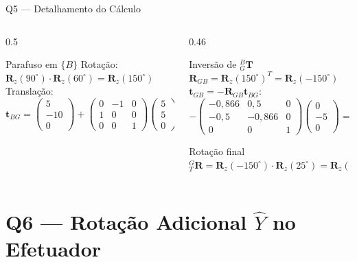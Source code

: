 \documentclass[aspectratio=169,12pt]{beamer}
\newcommand{\Rz}[1]{\mathbf{R}_z(#1)}
\newcommand{\Rot}[2]{{}^{#1}_{#2}\!\mathbf{R}}
\newcommand{\degr}{^{\circ}}
\newcommand{\mat}[1]{\begin{pmatrix}#1\end{pmatrix}}
\begin{document}
\begin{frame}{Q5 --- Detalhamento do Cálculo}
  \begin{columns}
    \begin{column}{0.5\textwidth}
      \begin{block}{Parafuso em $\{B\}$}
        \small
        Rotação: $\Rz{90\degr}\cdot\Rz{60\degr}=\Rz{150\degr}$\\[4pt]
        Translação:
        \[
          \mathbf{t}_{BG} = \mat{5\\-10\\0}+\mat{0&-1&0\\1&0&0\\0&0&1}\mat{5\\5\\0}=\mat{0\\-5\\0}
        \]
      \end{block}
    \end{column}
    \begin{column}{0.46\textwidth}
      \begin{block}{Inversão de ${}^{B}_{G}\mathbf{T}$}
        \small
        $\mathbf{R}_{GB}=\Rz{150\degr}^T=\Rz{-150\degr}$\\[4pt]
        $\mathbf{t}_{GB}=-\mathbf{R}_{GB}\mathbf{t}_{BG}$:
        \[
          -\mat{-0{,}866&0{,}5&0\\-0{,}5&-0{,}866&0\\0&0&1}\mat{0\\-5\\0}=\mat{2{,}5\\-4{,}33\\0}
        \]
      \end{block}
      \begin{alertblock}{Rotação final}
        $\Rot{G}{T}=\Rz{-150\degr}\cdot\Rz{25\degr}=\Rz{-125\degr}$
      \end{alertblock}
    \end{column}
  \end{columns}
\end{frame}

\section{Q6 --- Rotação Adicional $\hat{Y}$ no Efetuador}
\end{document}
